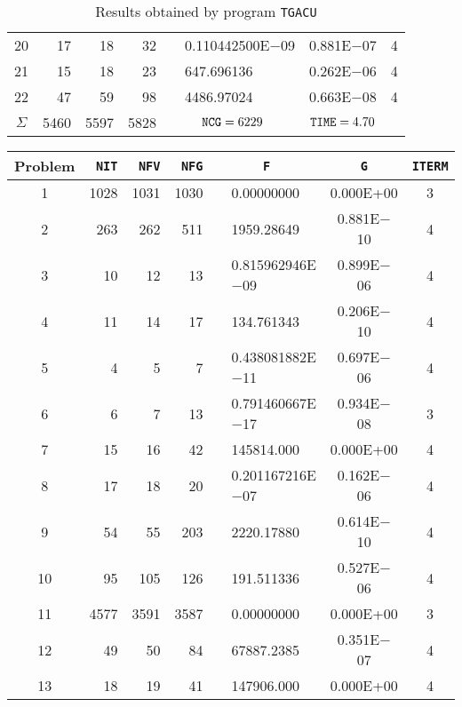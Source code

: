 \documentclass{esub2acm}
\begin{document}
\begin{table}
\begin{tabular}{c|rrrr@{}lcc}
20  &   17  &   18  &   32  &       &   0.110442500E$-$09   &   0.881E$-$07 &   4   \\
21  &   15  &   18  &   23  &       &   647.696136  &   0.262E$-$06 &   4   \\
22  &   47  &   59  &   98  &       &   4486.97024  &   0.663E$-$08 &   4   \\ \hline
$\Sigma$\rule[-2pt]{0pt}{12pt}  &   5460    &   5597    &   5828    &   \multicolumn{2}{c}{${\tt NCG} = 6229$} &   ${\tt TIME} = 4.70$ & \\ \hline
\end{tabular}
\caption{Results obtained by program {\tt TGACU}}
\label{tgacu}
\end{table}

\begin{table}
\footnotesize
\centering
\begin{tabular}{c|rrrr@{}lcc} \hline
Problem\rule[-2pt]{0pt}{12pt} & {\tt NIT} & {\tt NFV} & {\tt NFG} & \multicolumn{2}{c}{\tt F} & {\tt G} & {\tt ITERM} \\ \hline
1\rule[-2pt]{0pt}{12pt} &   1028    &   1031    &   1030    &       &   0.00000000  &   0.000E+00   &   3   \\
2   &   263 &   262 &   511 &       &   1959.28649  &   0.881E$-$10 &   4   \\
3   &   10  &   12  &   13  &       &   0.815962946E$-$09   &   0.899E$-$06 &   4   \\
4   &   11  &   14  &   17  &       &   134.761343  &   0.206E$-$10 &   4   \\
5   &   4   &   5   &   7   &       &   0.438081882E$-$11   &   0.697E$-$06 &   4   \\
6   &   6   &   7   &   13  &       &   0.791460667E$-$17   &   0.934E$-$08 &   3   \\
7   &   15  &   16  &   42  &       &   145814.000  &   0.000E+00   &   4   \\
8   &   17  &   18  &   20  &       &   0.201167216E$-$07   &   0.162E$-$06 &   4   \\
9   &   54  &   55  &   203 &       &   2220.17880  &   0.614E$-$10 &   4   \\
10  &   95  &   105 &   126 &       &   191.511336  &   0.527E$-$06 &   4   \\
11  &   4577    &   3591    &   3587    &       &   0.00000000  &   0.000E+00   &   3   \\
12  &   49  &   50  &   84  &       &   67887.2385  &   0.351E$-$07 &   4   \\
13  &   18  &   19  &   41  &       &   147906.000  &   0.000E+00   &   4   \\

\end{tabular}
\end{table}
\end{document}
